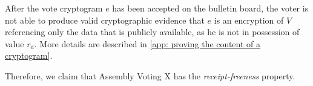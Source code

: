 After the vote cryptogram $e$ has been accepted on the bulletin board, the voter is not able to produce valid cryptographic evidence that $e$ is an encryption of $V$ referencing only the data that is publicly available, as he is not in possession of value $r_\mathrm{d}$. More details are described in \cref{app: proving the content of a cryptogram}.

Therefore, we claim that Assembly Voting X has the \textit{receipt-freeness} property.
